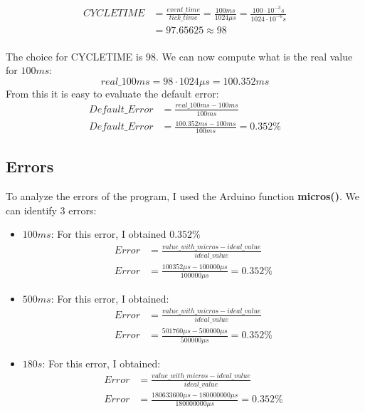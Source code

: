 \documentclass[a4paper]{article}
\begin{document}
\begin{align*}
  CYCLETIME & = \frac{event\_time}{tick\_time} = \frac{100ms}{1024\mu s} = \frac{100 \cdot 10^{-3} s}{1024 \cdot 10^{-6} s} \\[1ex]
            & = 97.65625 \approx 98
\end{align*} \\
The choice for CYCLETIME is 98. We can now compute what is the real value for \(100ms\):
\begin{equation*}
  real\_100ms = 98 \cdot 1024\mu s = 100.352ms
\end{equation*}
From this it is easy to evaluate the default error:
\begin{align}
  Default\_Error & = \frac{real\_100ms - 100ms}{100ms}                  \label{Default_Error1} \\[1ex]
  Default\_Error & = \frac{100.352ms - 100ms}{100ms} = 0.352\%    \label{Default_Error2}
\end{align}


\subsection{Errors}
To analyze the errors of the program, I used the Arduino function \textbf{micros()}. We can identify 3 errors:
\begin{itemize}
  \item \(100ms\): For this error, I obtained \(0.352\%\)
        \begin{align*}
          Error & = \frac{value\_with\_micros - ideal\_value}{ideal\_value} \\[1ex]
          Error & = \frac{100352\mu s - 100000\mu s}{100000\mu s} = 0.352\%
        \end{align*}
  \item \(500ms\): For this error, I obtained:
        \begin{align*}
          Error & = \frac{value\_with\_micros - ideal\_value}{ideal\_value} \\[1ex]
          Error & = \frac{501760\mu s - 500000\mu s}{500000\mu s} = 0.352\%
        \end{align*}
  \item \(180s\): For this error, I obtained:
        \begin{align*}
          Error & = \frac{value\_with\_micros - ideal\_value}{ideal\_value}          \\[1ex]
          Error & = \frac{180633600\mu s - 180000000\mu s}{180000000\mu s} = 0.352\%
        \end{align*}
\end{itemize}
\end{document}
